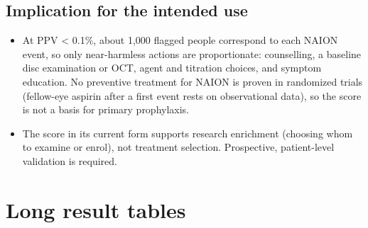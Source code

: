 \documentclass[journal]{IEEEtran}
\providecommand{\tightlist}{\setlength{\itemsep}{0pt}\setlength{\parskip}{0pt}}
\begin{document}
\subsection{Implication for the intended
use}\label{implication-for-the-intended-use}

\begin{itemize}
\tightlist
\item
  At PPV \textless{} 0.1\%, about 1,000 flagged people correspond to
  each NAION event, so only near-harmless actions are proportionate:
  counselling, a baseline disc examination or OCT, agent and titration
  choices, and symptom education. No preventive treatment for NAION is
  proven in randomized trials (fellow-eye aspirin after a first event
  rests on observational data), so the score is not a basis for primary
  prophylaxis.
\item
  The score in its current form supports research enrichment (choosing
  whom to examine or enrol), not treatment selection. Prospective,
  patient-level validation is required.
\end{itemize}

\section{Long result tables}
\end{document}
